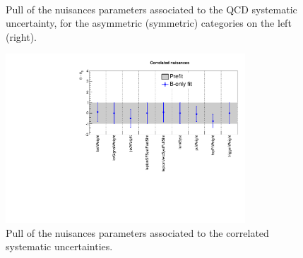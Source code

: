 \begin{figure}[tbhp]
    \caption{ Pull of the nuisances parameters associated to the QCD systematic uncertainty, 
      for the asymmetric (symmetric) categories on the left (right).
      \label{fig:nuisPull_qcd}}
  \begin{center}
     ~~
  \end{center}
\end{figure}


\begin{figure}[tbhp]
    \caption{ Pull of the nuisances parameters associated to the correlated systematic uncertainties. 
      \label{fig:nuisPull_Correlated}}
  \begin{center}
    \includegraphics[width=0.8\textwidth]{figures/postFitResults/nuisancePlots/Correlated_nuisances}
  \end{center}
\end{figure}
